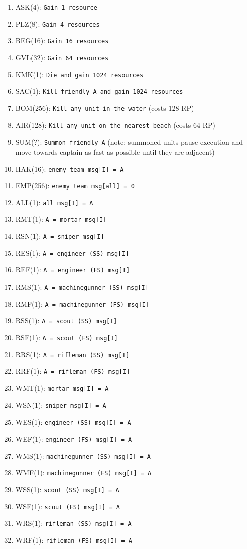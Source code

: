 \documentclass{article}
\begin{document}
\begin{enumerate}[noitemsep]
    \item ASK(4): \texttt{Gain 1 resource}
    \item PLZ(8): \texttt{Gain 4 resources}
    \item BEG(16): \texttt{Gain 16 resources}
    \item GVL(32): \texttt{Gain 64 resources}
    \item KMK(1): \texttt{Die and gain 1024 resources}
    \item SAC(1): \texttt{Kill friendly A and gain 1024 resources}
    \item BOM(256): \texttt{Kill any unit in the water} (costs 128 RP)
    \item AIR(128): \texttt{Kill any unit on the nearest beach} (costs 64 RP)
    \item SUM(?): \texttt{Summon friendly A} (note: summoned units pause
        execution and move towards captain as fast as possible until they
        are adjacent)
    \item HAK(16): \texttt{enemy team msg[I] = A}
    \item EMP(256): \texttt{enemy team msg[all] = 0}
    \item ALL(1): \texttt{all msg[I] = A}
    \item RMT(1): \texttt{A = mortar msg[I]}
    \item RSN(1): \texttt{A = sniper msg[I]}
    \item RES(1): \texttt{A = engineer (SS) msg[I]}
    \item REF(1): \texttt{A = engineer (FS) msg[I]}
    \item RMS(1): \texttt{A = machinegunner (SS) msg[I]}
    \item RMF(1): \texttt{A = machinegunner (FS) msg[I]}
    \item RSS(1): \texttt{A = scout (SS) msg[I]}
    \item RSF(1): \texttt{A = scout (FS) msg[I]}
    \item RRS(1): \texttt{A = rifleman (SS) msg[I]}
    \item RRF(1): \texttt{A = rifleman (FS) msg[I]}
    \item WMT(1): \texttt{mortar msg[I] = A}
    \item WSN(1): \texttt{sniper msg[I] = A}
    \item WES(1): \texttt{engineer (SS) msg[I] = A}
    \item WEF(1): \texttt{engineer (FS) msg[I] = A}
    \item WMS(1): \texttt{machinegunner (SS) msg[I] = A}
    \item WMF(1): \texttt{machinegunner (FS) msg[I] = A}
    \item WSS(1): \texttt{scout (SS) msg[I] = A}
    \item WSF(1): \texttt{scout (FS) msg[I] = A}
    \item WRS(1): \texttt{rifleman (SS) msg[I] = A}
    \item WRF(1): \texttt{rifleman (FS) msg[I] = A}
\end{enumerate}
\end{document}
